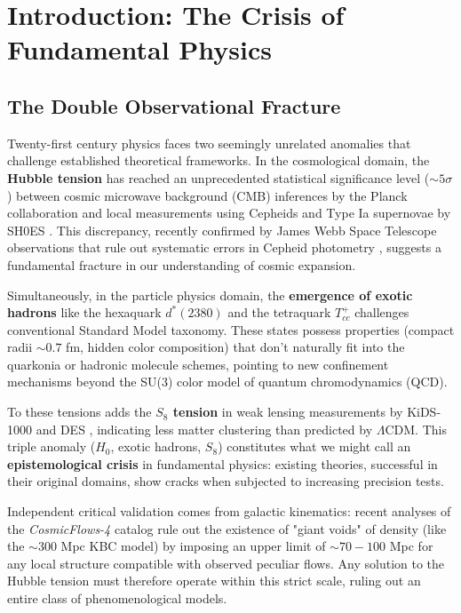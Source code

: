 \documentclass[11pt, a4paper]{article}
\theoremstyle{plain}
\theoremstyle{definition}
\begin{document}
\tableofcontents
\newpage


\section{Introduction: The Crisis of Fundamental Physics}
\label{sec:introduction}

\subsection{The Double Observational Fracture}

Twenty-first century physics faces two seemingly unrelated anomalies that challenge established theoretical frameworks. In the cosmological domain, the \textbf{Hubble tension} has reached an unprecedented statistical significance level ($\sim 5\sigma$) between cosmic microwave background (CMB) inferences by the Planck collaboration \cite{Planck2018} and local measurements using Cepheids and Type Ia supernovae by SH0ES \cite{Riess2022}. This discrepancy, recently confirmed by James Webb Space Telescope observations that rule out systematic errors in Cepheid photometry \cite{Riess2024}, suggests a fundamental fracture in our understanding of cosmic expansion.

Simultaneously, in the particle physics domain, the \textbf{emergence of exotic hadrons} like the hexaquark $d^*(2380)$ \cite{Bashkanov2024} and the tetraquark $T_{cc}^+$ \cite{Harada2025} challenges conventional Standard Model taxonomy. These states possess properties (compact radii $\sim 0.7$ fm, hidden color composition) that don't naturally fit into the quarkonia or hadronic molecule schemes, pointing to new confinement mechanisms beyond the SU(3) color model of quantum chromodynamics (QCD).

To these tensions adds the \textbf{$S_8$ tension} in weak lensing measurements by KiDS-1000 \cite{KiDS2021} and DES \cite{DES2022}, indicating less matter clustering than predicted by $\Lambda$CDM. This triple anomaly ($H_0$, exotic hadrons, $S_8$) constitutes what we might call an \textbf{epistemological crisis} in fundamental physics: existing theories, successful in their original domains, show cracks when subjected to increasing precision tests.

Independent critical validation comes from galactic kinematics: recent analyses of the \textit{CosmicFlows-4} catalog \cite{Mazurenko2024} rule out the existence of "giant voids" of density (like the $\sim 300$ Mpc KBC model) by imposing an upper limit of $\sim 70-100$ Mpc for any local structure compatible with observed peculiar flows. Any solution to the Hubble tension must therefore operate within this strict scale, ruling out an entire class of phenomenological models.
\end{document}
